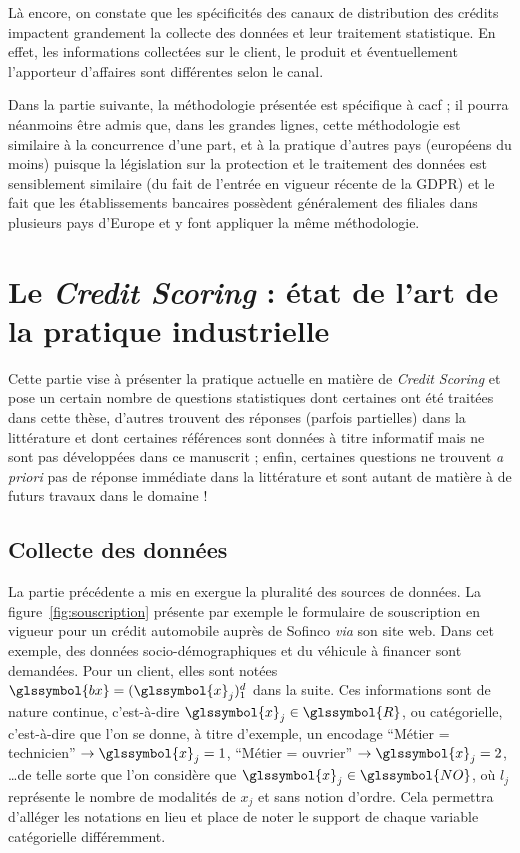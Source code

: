 Là encore, on constate que les spécificités des canaux de distribution des crédits impactent grandement la collecte des données et leur traitement statistique. En effet, les informations collectées sur le client, le produit et éventuellement l'apporteur d'affaires sont différentes selon le canal.

Dans la partie suivante, la méthodologie présentée est spécifique à \gls{cacf} ; il pourra néanmoins être admis que, dans les grandes lignes, cette méthodologie est similaire à la concurrence d'une part, et à la pratique d'autres pays (européens du moins) puisque la législation sur la protection et le traitement des données est sensiblement similaire (du fait de l'entrée en vigueur récente de la GDPR) et le fait que les établissements bancaires possèdent généralement des filiales dans plusieurs pays d'Europe et y font appliquer la même méthodologie.


\section{Le \textit{Credit Scoring} : état de l'art de la pratique industrielle} \label{chap1:sec2}

Cette partie vise à présenter la pratique actuelle en matière de \textit{Credit Scoring} et pose un certain nombre de questions statistiques dont certaines ont été traitées dans cette thèse, d'autres trouvent des réponses (parfois partielles) dans la littérature et dont certaines références sont données à titre informatif mais ne sont pas développées dans ce manuscrit ; enfin, certaines questions ne trouvent \textit{a priori} pas de réponse immédiate dans la littérature et sont autant de matière à de futurs travaux dans le domaine !

\subsection{Collecte des données}

La partie précédente a mis en exergue la pluralité des sources de données. La figure~\ref{fig:souscription} présente par exemple le formulaire de souscription en vigueur pour un crédit automobile auprès de Sofinco \textit{via} son site web. Dans cet exemple, des données socio-démographiques et du véhicule à financer sont demandées. Pour un client, elles sont notées $\glssymbol{bx} = (\glssymbol{x}_j)_1^d$ dans la suite. Ces informations sont de nature continue, c'est-à-dire $\glssymbol{x}_j \in \glssymbol{R}$, ou catégorielle, c'est-à-dire que l'on se donne, à titre d'exemple, un encodage ``Métier = technicien'' $\rightarrow \glssymbol{x}_j = 1$, ``Métier = ouvrier'' $\rightarrow \glssymbol{x}_j = 2$, \dots de telle sorte que l'on considère que $\glssymbol{x}_j \in \glssymbol{NO}$, où $l_j$ représente le nombre de modalités de $x_j$ et sans notion d'ordre. Cela permettra d'alléger les notations en lieu et place de noter le support de chaque variable catégorielle différemment.

